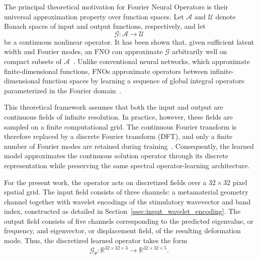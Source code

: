 \documentclass[preprint,review,12pt,numafflabel]{elsarticle}
\begin{document}
The principal theoretical motivation for Fourier Neural Operators is their universal approximation property over function spaces. Let $\mathcal{A}$ and $\mathcal{U}$ denote Banach spaces of input and output functions, respectively, and let
\begin{equation}
\mathcal{G}:\mathcal{A}\rightarrow\mathcal{U}
\end{equation}
be a continuous nonlinear operator. It has been shown that, given sufficient latent width and Fourier modes, an FNO can approximate $\mathcal{G}$ arbitrarily well on compact subsets of $\mathcal{A}$~\cite{kovachki2023neural}. Unlike conventional neural networks, which approximate finite-dimensional functions, FNOs approximate operators between infinite-dimensional function spaces by learning a sequence of global integral operators parameterized in the Fourier domain~\cite{li2021fno}.

This theoretical framework assumes that both the input and output are continuous fields of infinite resolution. In practice, however, these fields are sampled on a finite computational grid. The continuous Fourier transform is therefore replaced by a discrete Fourier transform (DFT), and only a finite number of Fourier modes are retained during training~\cite{li2021fno,qin2024spectralfno}. Consequently, the learned model approximates the continuous solution operator through its discrete representation while preserving the same spectral operator-learning architecture.

For the present work, the operator acts on discretized fields over a $32\times32$ pixel spatial grid. The input field consists of three channels: a metamaterial geometry channel together with wavelet encodings of the stimulatory wavevector and band index, constructed as detailed in Section~\ref{ssec:input_wavelet_encoding}. The output field consists of five channels corresponding to the predicted eigenvalue, or frequency, and eigenvector, or displacement field, of the resulting deformation mode. Thus, the discretized learned operator takes the form
\begin{equation}
\mathcal{G}_{\theta}:
\mathbb{R}^{32\times32\times3}
\rightarrow
\mathbb{R}^{32\times32\times5}.
\end{equation}
\end{document}
